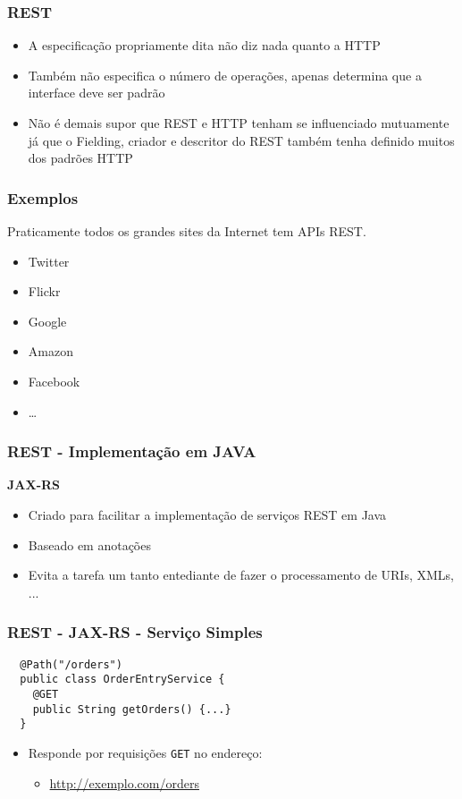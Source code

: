 \documentclass[Ligatures=TeX,table,brazil,svgnames,usetotalslideindicator,comp
ress,10pt]{beamer}
\begin{document}
\begin{frame}
  \frametitle{REST}
  \begin{itemize}
  \item A especificação propriamente dita não diz nada quanto a HTTP
  \item Também não especifica o número de operações, apenas determina
    que a interface deve ser padrão
  \item Não é demais supor que REST e HTTP tenham se influenciado
    mutuamente já que o Fielding, criador e descritor do REST também
    tenha definido muitos dos padrões HTTP
  \end{itemize}
\end{frame}

\begin{frame}
  \frametitle{Exemplos}
  Praticamente todos os grandes sites da Internet tem APIs REST.
  \begin{itemize}
  \item Twitter
  \item Flickr
  \item Google
  \item Amazon
  \item Facebook
  \item \ldots
  \end{itemize}
\end{frame}

\begin{frame}
  \frametitle{REST - Implementação em JAVA}
  \alert{\textbf{JAX-RS}}
  \begin{itemize}
  \item Criado para facilitar a implementação de serviços REST em Java
  \item Baseado em anotações
  \item Evita a tarefa um tanto entediante de fazer o processamento de
    URIs, XMLs, ...
  \end{itemize}
\end{frame}

\begin{frame}[fragile]
  \frametitle{REST - JAX-RS - Serviço Simples}

\begin{verbatim}
  @Path("/orders")
  public class OrderEntryService {
    @GET
    public String getOrders() {...}
  }
\end{verbatim}

\begin{itemize}
\item Responde por requisições \alert{\texttt{GET}} no endereço:
  \begin{itemize}
  \item \url{http://exemplo.com/orders}
  \end{itemize}
\end{itemize}
\end{frame}
\end{document}
